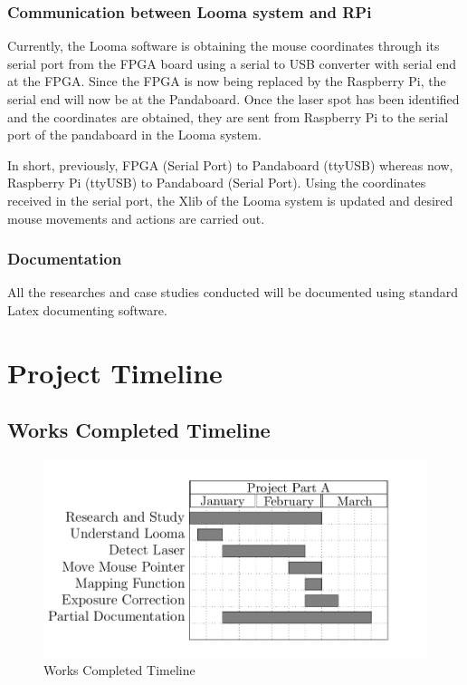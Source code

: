 \documentclass[12pt, a4paper]{article}
\begin{document}
\subsubsection{Communication between Looma system and RPi}
	Currently, the Looma software is obtaining the mouse coordinates through its serial port from the FPGA board using a serial to USB converter with serial end at the FPGA. Since the FPGA is now being replaced by the Raspberry Pi, the serial end will now be at the Pandaboard. Once the laser spot has been identified and the coordinates are obtained, they are sent from Raspberry Pi to the serial port of the pandaboard in the Looma system.

	In short, previously, FPGA (Serial Port) to Pandaboard (ttyUSB) whereas now, Raspberry Pi (ttyUSB) to Pandaboard (Serial Port). Using the coordinates received in the serial port, the Xlib of the Looma system is updated and desired mouse movements and actions are carried out.

\subsubsection{Documentation}
	All the researches and case studies conducted will be documented using standard Latex documenting software.

\newpage
\section{Project Timeline}
\subsection{Works Completed Timeline}
\begin{figure}[htp]
\centering
\includegraphics[scale=0.35]{reformed1.png}
\caption{Works Completed Timeline}
\label{}
\end{figure}
\end{document}
